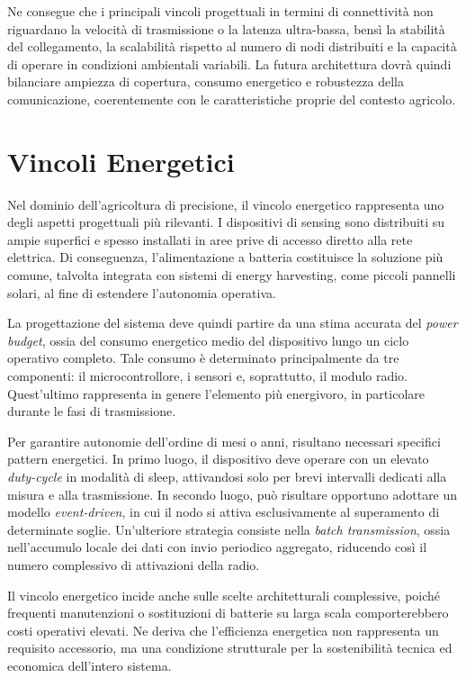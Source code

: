 Ne consegue che i principali vincoli progettuali in termini di connettività non riguardano la velocità di trasmissione o la latenza ultra-bassa, bensì la stabilità del collegamento, la scalabilità rispetto al numero di nodi distribuiti e la capacità di operare in condizioni ambientali variabili. La futura architettura dovrà quindi bilanciare ampiezza di copertura, consumo energetico e robustezza della comunicazione, coerentemente con le caratteristiche proprie del contesto agricolo.

\section{Vincoli Energetici}

Nel dominio dell’agricoltura di precisione, il vincolo energetico rappresenta uno degli aspetti progettuali più rilevanti. I dispositivi di sensing sono distribuiti su ampie superfici e spesso installati in aree prive di accesso diretto alla rete elettrica. Di conseguenza, l’alimentazione a batteria costituisce la soluzione più comune, talvolta integrata con sistemi di energy harvesting, come piccoli pannelli solari, al fine di estendere l’autonomia operativa.

La progettazione del sistema deve quindi partire da una stima accurata del \textit{power budget}, ossia del consumo energetico medio del dispositivo lungo un ciclo operativo completo. Tale consumo è determinato principalmente da tre componenti: il microcontrollore, i sensori e, soprattutto, il modulo radio. Quest’ultimo rappresenta in genere l’elemento più energivoro, in particolare durante le fasi di trasmissione.

Per garantire autonomie dell’ordine di mesi o anni, risultano necessari specifici pattern energetici. In primo luogo, il dispositivo deve operare con un elevato \textit{duty-cycle} in modalità di sleep, attivandosi solo per brevi intervalli dedicati alla misura e alla trasmissione. In secondo luogo, può risultare opportuno adottare un modello \textit{event-driven}, in cui il nodo si attiva esclusivamente al superamento di determinate soglie. Un’ulteriore strategia consiste nella \textit{batch transmission}, ossia nell’accumulo locale dei dati con invio periodico aggregato, riducendo così il numero complessivo di attivazioni della radio.

Il vincolo energetico incide anche sulle scelte architetturali complessive, poiché frequenti manutenzioni o sostituzioni di batterie su larga scala comporterebbero costi operativi elevati. Ne deriva che l’efficienza energetica non rappresenta un requisito accessorio, ma una condizione strutturale per la sostenibilità tecnica ed economica dell’intero sistema.

